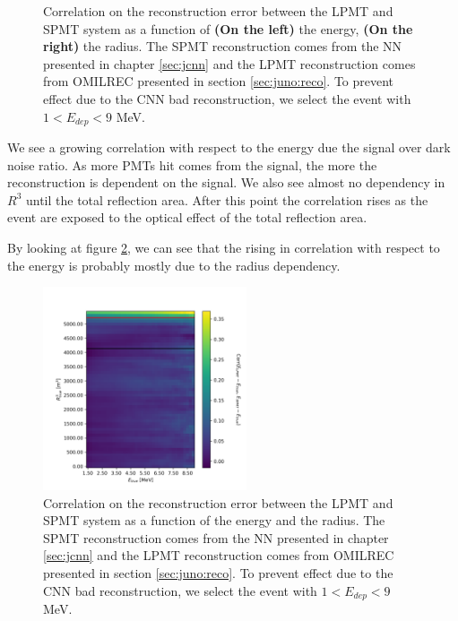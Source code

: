 \documentclass[../main.tex]{subfiles}
\begin{document}
\begin{figure}[ht]
\begin{subfigure}[t]{0.48\linewidth}
  \end{subfigure}
  \caption{Correlation on the reconstruction error between the LPMT and SPMT system as a function of \textbf{(On the left)} the energy, \textbf{(On the right)} the radius. The SPMT reconstruction comes from the NN presented in chapter \ref{sec:jcnn} and the LPMT reconstruction comes from OMILREC presented in section \ref{sec:juno:reco}. To prevent effect due to the CNN bad reconstruction, we select the event with $1 < E_{dep} < 9$ MeV.}
  \label{fig:joint_fit:empirical_corr:E_a_R}
\end{figure}

We see a growing correlation with respect to the energy due the signal over dark noise ratio. As more PMTs hit comes from the signal, the more the reconstruction is dependent on the signal. We also see almost no dependency in $R^3$ until the total reflection area. After this point the correlation rises as the event are exposed to the optical effect of the total reflection area.

By looking at figure \ref{fig:joint_fit:empirical_corr:E_R}, we can see that the rising in correlation with respect to the energy is probably mostly due to the radius dependency.

\begin{figure}[ht]
  \centering
  \includegraphics[height=6cm]{images/joint_fit/E_R_corr.png}
  \caption{Correlation on the reconstruction error between the LPMT and SPMT system as a function of  the energy and the radius. The SPMT reconstruction comes from the NN presented in chapter \ref{sec:jcnn} and the LPMT reconstruction comes from OMILREC presented in section \ref{sec:juno:reco}. To prevent effect due to the CNN bad reconstruction, we select the event with $1 < E_{dep} < 9$ MeV.}
  \label{fig:joint_fit:empirical_corr:E_R}
\end{figure}
\end{document}

